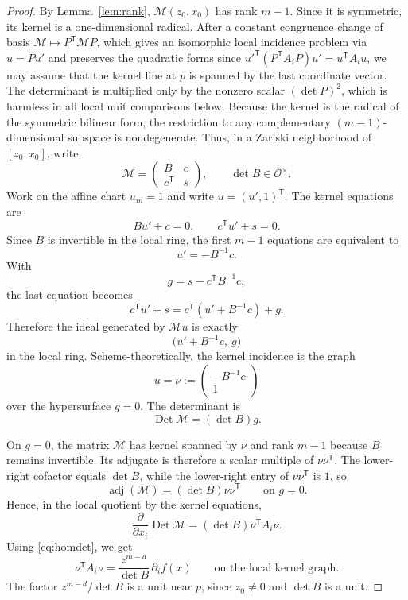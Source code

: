 \documentclass[10pt,a4paper]{amsart}
\DeclareMathOperator{\Det}{Det}
\DeclareMathOperator{\adj}{adj}
\newcommand{\Mcal}{\mathcal M}
\newcommand{\OO}{\mathcal O}
\begin{document}
\begin{proof}
By Lemma~\ref{lem:rank}, $\Mcal(z_0,x_0)$ has rank $m-1$.  Since it is
symmetric, its kernel is a one-dimensional radical.  After a constant congruence
change of basis $\Mcal\mapsto P^{\mathsf T}\Mcal P$, which gives an
isomorphic local incidence problem via $u=P u'$ and preserves the quadratic
forms since ${u'}^{\mathsf T}(P^{\mathsf T}A_iP)u'=u^{\mathsf T}A_i u$, we
may assume that the kernel line at $p$ is spanned by the last coordinate vector.
The determinant is multiplied only by the nonzero scalar $(\det P)^2$, which is
harmless in all local unit comparisons below.  Because the kernel is the radical
of the symmetric bilinear form, the restriction to any complementary
$(m-1)$-dimensional subspace is nondegenerate.  Thus, in a Zariski neighborhood
of $[z_0:x_0]$, write
\[
  \Mcal=\begin{pmatrix}B&c\\ c^{\mathsf T}&s\end{pmatrix},
  \qquad \det B\in\OO^\times.
\]
Work on the affine chart $u_m=1$ and write $u=(u',1)^{\mathsf T}$.  The kernel
equations are
\[
  Bu'+c=0,
  \qquad
  c^{\mathsf T}u'+s=0.
\]
Since $B$ is invertible in the local ring, the first $m-1$ equations are
equivalent to
\[
  u'=-B^{-1}c.
\]
With
\[
  g=s-c^{\mathsf T}B^{-1}c,
\]
the last equation becomes
\[
  c^{\mathsf T}u'+s
  =c^{\mathsf T}(u'+B^{-1}c)+g.
\]
Therefore the ideal generated by $\Mcal u$ is exactly
\[
  \big(u'+B^{-1}c,\ g\big)
\]
in the local ring.  Scheme-theoretically, the kernel incidence is the graph
\[
  u=\nu:=\begin{pmatrix}-B^{-1}c\\1\end{pmatrix}
\]
over the hypersurface $g=0$.  The determinant is
\begin{equation}
\label{eq:schurdet}
  \Det\Mcal=(\det B)g.
\end{equation}

On $g=0$, the matrix $\Mcal$ has kernel spanned by $\nu$ and rank $m-1$ because
$B$ remains invertible.  Its adjugate is therefore a scalar multiple of
$\nu\nu^{\mathsf T}$.  The lower-right cofactor equals $\det B$, while the
lower-right entry of $\nu\nu^{\mathsf T}$ is $1$, so
\begin{equation}
\label{eq:adjlocal}
  \adj(\Mcal)=(\det B)\nu\nu^{\mathsf T}
  \qquad\text{on }g=0.
\end{equation}
Hence, in the local quotient by the kernel equations,
\[
  \frac{\partial}{\partial x_i}\Det\Mcal
  =(\det B)\nu^{\mathsf T}A_i\nu.
\]
Using \eqref{eq:homdet}, we get
\begin{equation}
\label{eq:unitpolar}
  \nu^{\mathsf T}A_i\nu
  =\frac{z^{m-d}}{\det B}\,\partial_i f(x)
  \qquad\text{on the local kernel graph.}
\end{equation}
The factor $z^{m-d}/\det B$ is a unit near $p$, since $z_0\ne0$ and
$\det B$ is a unit.


\end{proof}
\end{document}
